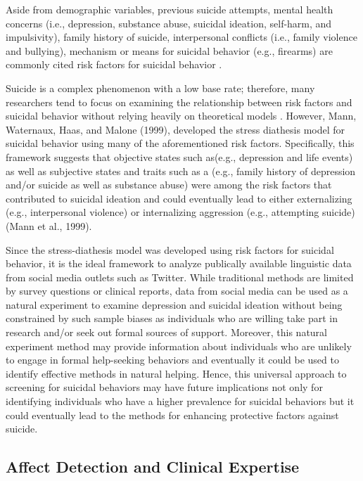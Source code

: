 \documentclass[11pt]{article}
\begin{document}
	Aside from demographic variables, previous suicide attempts, mental health concerns (i.e., depression, substance abuse, suicidal ideation, self-harm, and impulsivity), family history of suicide, interpersonal conflicts (i.e., family violence and bullying), mechanism or means for suicidal behavior (e.g., firearms)  are commonly cited risk factors for suicidal behavior \cite{nock2008suicide,crosby2011self,gaynes2004screening,harriss2005suicidal,shaffer2004columbia,shaffer2004columbia,brown2000risk}. 

Suicide is a complex phenomenon with a low base rate; therefore, many researchers tend to focus on examining the relationship between risk factors and suicidal behavior without relying heavily on theoretical models \cite{nock2008suicide} . However, Mann, Waternaux, Haas, and Malone (1999), developed the stress diathesis model for suicidal behavior using many of the aforementioned risk factors.  Specifically, this framework suggests that objective states such as(e.g.,  depression and life events) as well as subjective states and traits such as a (e.g., family history of depression and/or suicide as well as substance abuse) were among the risk factors that contributed to suicidal ideation and could eventually lead to either externalizing (e.g., interpersonal violence) or internalizing aggression (e.g., attempting suicide) (Mann et al., 1999).

	Since the stress-diathesis model was developed using risk factors for suicidal behavior, it is the ideal framework to analyze publically available linguistic data from social media outlets such as Twitter. While traditional methods are limited by survey questions or clinical reports, data from social media can be used as a natural experiment to examine depression and suicidal ideation without being constrained by such sample biases as individuals who are willing take part in research and/or seek out formal sources of support. Moreover, this natural experiment method may provide information about individuals who are unlikely to engage in formal help-seeking behaviors and eventually it could be used to identify effective methods in natural helping. Hence, this universal approach to screening for suicidal behaviors may have future implications not only for identifying individuals who have a higher prevalence for suicidal behaviors but it could eventually lead to the methods for enhancing protective factors against suicide.  


\subsection{Affect Detection and Clinical Expertise}
\end{document}
